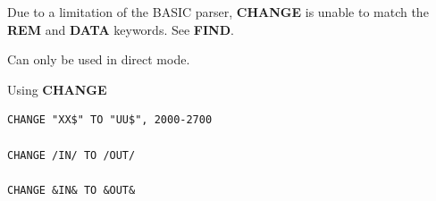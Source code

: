 \begin{description}[leftmargin=2cm,style=nextline]
                  Due to a limitation of the BASIC parser, {\bf CHANGE} is unable to match the {\bf REM} and {\bf DATA} keywords. See {\bf FIND}.

                  Can only be used in direct mode.

\item [Examples:] Using {\bf CHANGE}

\begin{tcolorbox}[colback=black,coltext=white]
\verbatimfont{\codefont}
\begin{verbatim}
CHANGE "XX$" TO "UU$", 2000-2700

CHANGE /IN/ TO /OUT/

CHANGE &IN& TO &OUT&
\end{verbatim}
\end{tcolorbox}
\end{description}


\newpage
